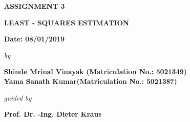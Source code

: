 \begin{center}
\vspace{-2.2cm}
\vspace{2.5cm}
\bfseries{ASSIGNMENT 3}\\
\vspace{0.5cm}
\begin{large}
{\bfseries LEAST - SQUARES ESTIMATION }\\
\end{large}
\vspace{0.5cm}
{\bfseries Date: 08/01/2019 }\\
\vspace{0.4cm}
\begin{small}
\emph{by}\\
\end{small}
\vspace{0.4cm}
\bfseries{Shinde Mrinal Vinayak (Matriculation No.: 5021349)\\Yama Sanath Kumar(Matriculation No.: 5021387)}\\
\vspace{0.3cm}
\begin{small}
\emph{guided by}\\
\end{small}
\vspace{0.3cm}
{\bfseries \large Prof. Dr. -Ing. Dieter Kraus}\\
\vspace{0.1cm}
\end{center}
